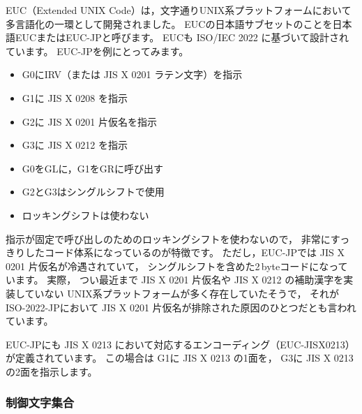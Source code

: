 \documentclass[a4j,10pt,fleqn,uplatex]{jsarticle}
\begin{document}
EUC（Extended UNIX Code）は，文字通りUNIX系プラットフォームにおいて多言語化の一環として開発されました。
EUCの日本語サブセットのことを日本語EUCまたはEUC-JPと呼びます。
EUCも ISO/IEC 2022 に基づいて設計されています。
EUC-JPを例にとってみます。
\begin{itemize}
\item G0にIRV（または JIS X 0201 ラテン文字）を指示
\item G1に JIS X 0208 を指示
\item G2に JIS X 0201 片仮名を指示
\item G3に JIS X 0212 を指示
\item G0をGLに，G1をGRに呼び出す
\item G2とG3はシングルシフトで使用
\item ロッキングシフトは使わない
\end{itemize}

指示が固定で呼び出しのためのロッキングシフトを使わないので，
非常にすっきりしたコード体系になっているのが特徴です。
ただし，EUC-JPでは JIS X 0201 片仮名が冷遇されていて，
シングルシフトを含めた2\,byteコードになっています。
実際，
つい最近まで JIS X 0201 片仮名や JIS X 0212 の補助漢字を実装していない
UNIX系プラットフォームが多く存在していたそうで，
それがISO-2022-JPにおいて JIS X 0201 片仮名が排除された原因のひとつだとも言われています。

EUC-JPにも JIS X 0213 において対応するエンコーディング（EUC-JISX0213）が定義されています。
この場合は
G1に JIS X 0213 の1面を，
G3に JIS X 0213 の2面を指示します。

\subsubsection{制御文字集合} \label{sec:ctrl-charset}
\end{document}
